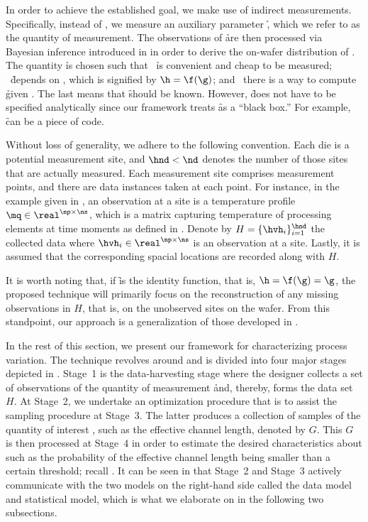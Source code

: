 In order to achieve the established goal, we make use of indirect measurements.
Specifically, instead of \g, we measure an auxiliary parameter \h, which we
refer to as the quantity of measurement. The observations of \h are then
processed via Bayesian inference introduced in  in
order to derive the on-wafer distribution of \g. The quantity \h is chosen such
that \one~\h is convenient and cheap to be measured; \two~\h depends on \g,
which is signified by $\h = \f(\g)$; and \three~there is a way to compute \h
given \g. The last means that \f should be known. However, \f does not have to
be specified analytically since our framework treats \f as a ``black box.'' For
example, \f can be a piece of code.

Without loss of generality, we adhere to the following convention. Each die is a
potential measurement site, and $\hnd < \nd$ denotes the number of those sites
that are actually measured. Each measurement site comprises \np measurement
points, and there are \ns data instances taken at each point. For instance, in
the example given in , an observation at a site is a
temperature profile $\mq \in \real^{\np \times \ns}$, which is a matrix
capturing temperature of \np processing elements at \ns time moments as defined
in . Denote by $H = \{ \hvh_i \}_{i = 1}^{\hnd}$ the
collected data where $\hvh_i \in \real^{\np \times \ns}$ is an observation at a
site. Lastly, it is assumed that the corresponding spacial locations are
recorded along with $H$.

It is worth noting that, if \f is the identity function, that is, $\h = \f(\g) =
\g$, the proposed technique will primarily focus on the reconstruction of any
missing observations in $H$, that is, on the unobserved sites on the wafer. From
this standpoint, our approach is a generalization of those developed in
\cite{reda2009, zhang2010}.

In the rest of this section, we present our framework for characterizing process
variation. The technique revolves around  and is divided
into four major stages depicted in . Stage~1 is the
data-harvesting stage where the designer collects a set of observations of the
quantity of measurement \h and, thereby, forms the data set $H$. At Stage~2, we
undertake an optimization procedure that is to assist the sampling procedure at
Stage~3. The latter produces a collection of samples of the quantity of interest
\g, such as the effective channel length, denoted by $G$. This $G$ is then
processed at Stage~4 in order to estimate the desired characteristics about \g
such as the probability of the effective channel length being smaller than a
certain threshold; recall . It can be seen in
 that Stage~2 and Stage~3 actively communicate with the
two models on the right-hand side called the data model and statistical model,
which is what we elaborate on in the following two subsections.

